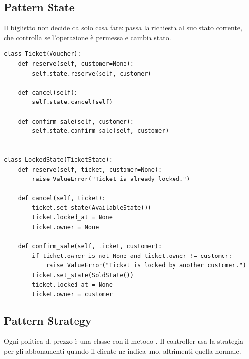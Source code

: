 \subsection{Pattern State}

Il biglietto non decide da solo cosa fare: passa la richiesta al suo stato corrente, che controlla se l'operazione è permessa e cambia stato.

\par\noindent\begin{minipage}{\linewidth}
\begin{lstlisting}
class Ticket(Voucher):
    def reserve(self, customer=None):
        self.state.reserve(self, customer)

    def cancel(self):
        self.state.cancel(self)

    def confirm_sale(self, customer):
        self.state.confirm_sale(self, customer)


class LockedState(TicketState):
    def reserve(self, ticket, customer=None):
        raise ValueError("Ticket is already locked.")

    def cancel(self, ticket):
        ticket.set_state(AvailableState())
        ticket.locked_at = None
        ticket.owner = None

    def confirm_sale(self, ticket, customer):
        if ticket.owner is not None and ticket.owner != customer:
            raise ValueError("Ticket is locked by another customer.")
        ticket.set_state(SoldState())
        ticket.locked_at = None
        ticket.owner = customer
\end{lstlisting}
\end{minipage}\par

\subsection{Pattern Strategy}

Ogni politica di prezzo è una classe con il metodo . Il controller usa la strategia per gli abbonamenti quando il cliente ne indica uno, altrimenti quella normale.

